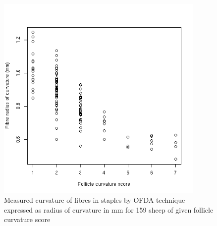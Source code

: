 %

\begin{figure}[!h]
  \centering
   \includegraphics[width=0.9\textwidth]{ofdamm.png}
  \caption{Measured curvature of fibres in staples by OFDA technique expressed as radius of curvature in mm for 159 sheep of   given follicle curvature score}
  \label{fig:ofdamm}
\end{figure}

%

